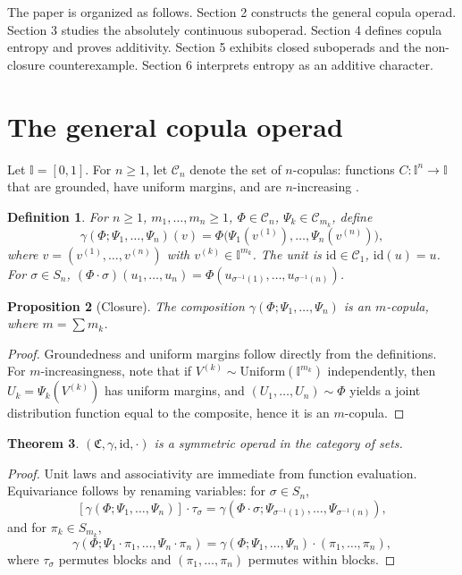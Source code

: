 \documentclass[11pt]{amsart}
\newtheorem{theorem}{Theorem}[section]
\newtheorem{proposition}[theorem]{Proposition}
\newtheorem{definition}[theorem]{Definition}
\newcommand{\I}{\mathbb I}
\begin{document}
\begin{sloppypar}
The paper is organized as follows. Section 2 constructs the general copula operad. Section 3 studies the absolutely continuous suboperad. Section 4 defines copula entropy and proves additivity. Section 5 exhibits closed suboperads and the non-closure counterexample. Section 6 interprets entropy as an additive character.

\section{The general copula operad}
\label{sec:operad}
Let $\I=[0,1]$. For $n\geq 1$, let $\mathcal{C}_{n}$ denote the set of $n$-copulas: functions $C:\I^{n}\to\I$ that are grounded, have uniform margins, and are $n$-increasing \cite{nelsen}.

\begin{definition}
\label{def:comp}
For $n\geq 1$, $m_{1},\dots,m_{n}\geq 1$, $\Phi\in\mathcal{C}_{n}$, $\Psi_{k}\in\mathcal{C}_{m_{k}}$, define
\[
\gamma(\Phi;\Psi_{1},\dots,\Psi_{n})(v)=\Phi\bigl(\Psi_{1}(v^{(1)}),\dots,\Psi_{n}(v^{(n)})\bigr),
\]
where $v=(v^{(1)},\dots,v^{(n)})$ with $v^{(k)}\in\I^{m_{k}}$. The unit is $\mathrm{id}\in\mathcal{C}_{1}$, $\mathrm{id}(u)=u$. For $\sigma\in S_{n}$, $(\Phi\cdot\sigma)(u_{1},\dots,u_{n})=\Phi(u_{\sigma^{-1}(1)},\dots,u_{\sigma^{-1}(n)})$.
\end{definition}

\begin{proposition}[Closure]
\label{prop:closure}
The composition $\gamma(\Phi;\Psi_{1},\dots,\Psi_{n})$ is an $m$-copula, where $\displaystyle m=\sum m_{k}$.
\end{proposition}

\begin{proof}
Groundedness and uniform margins follow directly from the definitions. For $m$-increasingness, note that if $V^{(k)}\sim\mathrm{Uniform}(\I^{m_{k}})$ independently, then $U_{k}=\Psi_{k}(V^{(k)})$ has uniform margins, and $(U_{1},\dots,U_{n})\sim\Phi$ yields a joint distribution function equal to the composite, hence it is an $m$-copula.
\end{proof}

\begin{theorem}
\label{thm:operad}
$(\mathfrak{C},\gamma,\mathrm{id},\cdot)$ is a symmetric operad in the category of sets.
\end{theorem}

\begin{proof}
Unit laws and associativity are immediate from function evaluation. Equivariance follows by renaming variables: for $\sigma\in S_{n}$,
\[
[\gamma(\Phi;\Psi_{1},\dots,\Psi_{n})]\cdot\tau_{\sigma}=\gamma(\Phi\cdot\sigma;\Psi_{\sigma^{-1}(1)},\dots,\Psi_{\sigma^{-1}(n)}),
\]
and for $\pi_{k}\in S_{m_{k}}$,
\[
\gamma(\Phi;\Psi_{1}\cdot\pi_{1},\dots,\Psi_{n}\cdot\pi_{n})=\gamma(\Phi;\Psi_{1},\dots,\Psi_{n})\cdot(\pi_{1},\dots,\pi_{n}),
\]
where $\tau_{\sigma}$ permutes blocks and $(\pi_{1},\dots,\pi_{n})$ permutes within blocks.
\end{proof}


\end{sloppypar}
\end{document}
